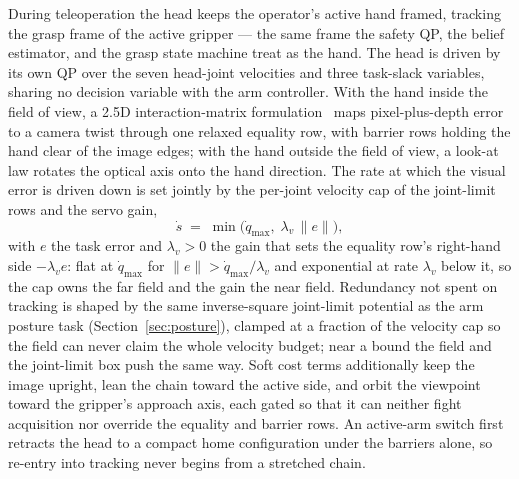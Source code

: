 \documentclass[12pt,a4paper,twoside,openright]{report}
\newcommand{\qdot}{\dot{q}}
\begin{document}
During teleoperation the head keeps the operator's active hand framed, tracking the grasp frame of the active gripper --- the same frame the safety QP, the belief estimator, and the grasp state machine treat as the hand. The head is driven by its own QP over the seven head-joint velocities and three task-slack variables, sharing no decision variable with the arm controller. With the hand inside the field of view, a 2.5D interaction-matrix formulation~\cite{malis1999,chaumette2006} maps pixel-plus-depth error to a camera twist through one relaxed equality row, with barrier rows holding the hand clear of the image edges; with the hand outside the field of view, a look-at law rotates the optical axis onto the hand direction. The rate at which the visual error is driven down is set jointly by the per-joint velocity cap of the joint-limit rows and the servo gain,
\begin{equation}
\dot{s} \;=\; \min\!\bigl(\qdot_{\max},\; \lambda_v\,\|e\|\bigr),
\label{eq:headvel}
\end{equation}
with $e$ the task error and $\lambda_v > 0$ the gain that sets the equality row's right-hand side $-\lambda_v e$: flat at $\qdot_{\max}$ for $\|e\| > \qdot_{\max}/\lambda_v$ and exponential at rate $\lambda_v$ below it, so the cap owns the far field and the gain the near field. Redundancy not spent on tracking is shaped by the same inverse-square joint-limit potential as the arm posture task (Section~\ref{sec:posture}), clamped at a fraction of the velocity cap so the field can never claim the whole velocity budget; near a bound the field and the joint-limit box push the same way. Soft cost terms additionally keep the image upright, lean the chain toward the active side, and orbit the viewpoint toward the gripper's approach axis, each gated so that it can neither fight acquisition nor override the equality and barrier rows. An active-arm switch first retracts the head to a compact home configuration under the barriers alone, so re-entry into tracking never begins from a stretched chain.
\end{document}
